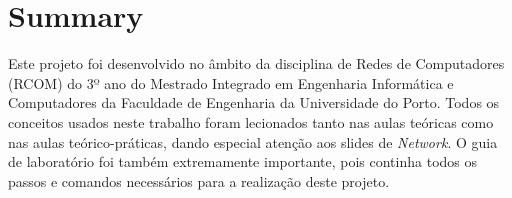 \documentclass[a4paper]{article}
\begin{document}
\maketitle
\thispagestyle{empty}


\newpage

%
%
%
%
%
%
%



\section{Summary}

Este projeto foi desenvolvido no âmbito da disciplina de Redes de Computadores (RCOM) do 3º ano do Mestrado Integrado em Engenharia Informática e Computadores da Faculdade de Engenharia da Universidade do Porto. Todos os conceitos usados neste trabalho foram lecionados tanto nas aulas teóricas como nas aulas teórico-práticas, dando especial atenção aos slides de \textit{Network}. O guia de laboratório foi também extremamente importante, pois continha todos os passos e comandos necessários para a realização deste projeto.
\end{document}
